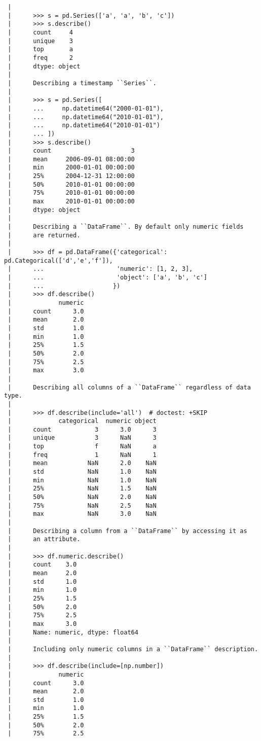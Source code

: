 \documentclass[
  letterpaper,
  DIV=11,
  numbers=noendperiod]{scrreprt}
\begin{document}
\begin{verbatim}
 |      
 |      >>> s = pd.Series(['a', 'a', 'b', 'c'])
 |      >>> s.describe()
 |      count     4
 |      unique    3
 |      top       a
 |      freq      2
 |      dtype: object
 |      
 |      Describing a timestamp ``Series``.
 |      
 |      >>> s = pd.Series([
 |      ...     np.datetime64("2000-01-01"),
 |      ...     np.datetime64("2010-01-01"),
 |      ...     np.datetime64("2010-01-01")
 |      ... ])
 |      >>> s.describe()
 |      count                      3
 |      mean     2006-09-01 08:00:00
 |      min      2000-01-01 00:00:00
 |      25%      2004-12-31 12:00:00
 |      50%      2010-01-01 00:00:00
 |      75%      2010-01-01 00:00:00
 |      max      2010-01-01 00:00:00
 |      dtype: object
 |      
 |      Describing a ``DataFrame``. By default only numeric fields
 |      are returned.
 |      
 |      >>> df = pd.DataFrame({'categorical': pd.Categorical(['d','e','f']),
 |      ...                    'numeric': [1, 2, 3],
 |      ...                    'object': ['a', 'b', 'c']
 |      ...                   })
 |      >>> df.describe()
 |             numeric
 |      count      3.0
 |      mean       2.0
 |      std        1.0
 |      min        1.0
 |      25%        1.5
 |      50%        2.0
 |      75%        2.5
 |      max        3.0
 |      
 |      Describing all columns of a ``DataFrame`` regardless of data type.
 |      
 |      >>> df.describe(include='all')  # doctest: +SKIP
 |             categorical  numeric object
 |      count            3      3.0      3
 |      unique           3      NaN      3
 |      top              f      NaN      a
 |      freq             1      NaN      1
 |      mean           NaN      2.0    NaN
 |      std            NaN      1.0    NaN
 |      min            NaN      1.0    NaN
 |      25%            NaN      1.5    NaN
 |      50%            NaN      2.0    NaN
 |      75%            NaN      2.5    NaN
 |      max            NaN      3.0    NaN
 |      
 |      Describing a column from a ``DataFrame`` by accessing it as
 |      an attribute.
 |      
 |      >>> df.numeric.describe()
 |      count    3.0
 |      mean     2.0
 |      std      1.0
 |      min      1.0
 |      25%      1.5
 |      50%      2.0
 |      75%      2.5
 |      max      3.0
 |      Name: numeric, dtype: float64
 |      
 |      Including only numeric columns in a ``DataFrame`` description.
 |      
 |      >>> df.describe(include=[np.number])
 |             numeric
 |      count      3.0
 |      mean       2.0
 |      std        1.0
 |      min        1.0
 |      25%        1.5
 |      50%        2.0
 |      75%        2.5

\end{verbatim}
\end{document}
